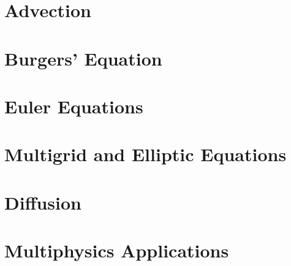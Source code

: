 \documentclass[11pt]{book}
\begin{document}
\chapter{Advection}



\chapter{Burgers' Equation}



\chapter{Euler Equations}





\chapter{Multigrid and Elliptic Equations}



\chapter{Diffusion}



\chapter{Multiphysics Applications}





\end{document}
